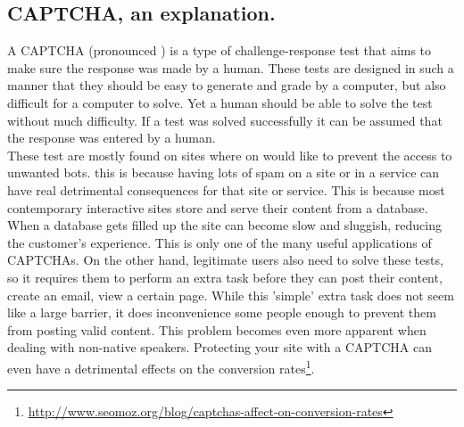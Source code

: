 \documentclass[pdftex,a4paper,12pt,twoside]{report}
\begin{document}
\subsection{CAPTCHA, an explanation.}
A CAPTCHA (pronounced %
) is a type of challenge-response test that aims to make sure the response was made by a human. These tests are designed in such a manner that they should be easy to generate and grade by a computer, but also difficult for a computer to solve. Yet a human should be able to solve the test without much difficulty. If a test was solved successfully it can be assumed that the response was entered by a human.\\
These test are mostly found on sites where on would like to prevent the access to unwanted bots. this is because having lots of spam on a site or in a service can have real detrimental consequences for that site or service. This is because most contemporary interactive sites store and serve their content from a database. When a database gets filled up the site can become slow and sluggish, reducing the customer's experience. This is only one of the many useful applications of CAPTCHAs. On the other hand, legitimate users also need to solve these tests, so it requires them to perform an extra task before they can post their content, create an email, view a certain page. While this 'simple' extra task does not seem like a large barrier, it does inconvenience some people enough to prevent them from posting valid content. This problem becomes even more apparent when dealing with non-native speakers\citep{Banday2011}. Protecting your site with a CAPTCHA can even have a detrimental effects on the conversion rates\footnote{\url{http://www.seomoz.org/blog/captchas-affect-on-conversion-rates}}.
\end{document}
